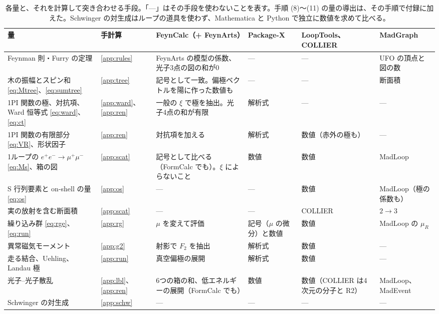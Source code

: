 \documentclass[a4paper,10pt]{ltjsarticle}
\begin{document}
\begin{table}[tbp]
\centering\small
\caption{各量と、それを計算して突き合わせる手段。「—」はその手段を使わないことを表す。手順 (8)〜(11) の量の導出は、その手順で付録に加えた。Schwinger の対生成はループの道具を使わず、Mathematica と Python で独立に数値を求めて比べる。}
\label{tab:plan}
\begin{tabularx}{\linewidth}{>{\raggedright\arraybackslash}p{3.4cm}>{\raggedright\arraybackslash}p{1.3cm}>{\raggedright\arraybackslash}X>{\raggedright\arraybackslash}p{1.75cm}>{\raggedright\arraybackslash}p{1.75cm}>{\raggedright\arraybackslash}p{2.0cm}}
\toprule
\textbf{量} & \textbf{手計算} & \textbf{FeynCalc（+ FeynArts）} & \textbf{Package-X} & \textbf{LoopTools、COLLIER} & \textbf{MadGraph} \\
\midrule
Feynman 則・Furry の定理 & \ref{app:rules} & FeynArts の模型の係数、光子3点の図の和が0 & — & — & UFO の頂点と図の数 \\
木の振幅とスピン和 \eqref{eq:Mtree}、\eqref{eq:sumtree} & \ref{app:tree} & 記号として一致。偏極ベクトルを陽に作った数値も & — & — & 断面積 \\
1PI 関数の極、対抗項、Ward 恒等式 \eqref{eq:ward}、\eqref{eq:ct} & \ref{app:ward}、\ref{app:ren} & 一般の $\xi$ で極を抽出。光子4点の和が有限 & 解析式 & — & — \\
1PI 関数の有限部分 \eqref{eq:VR}、形状因子 & \ref{app:ren} & 対抗項を加える & 解析式 & 数値（赤外の極も） & — \\
1ループの $e^+e^-\to\mu^+\mu^-$ \eqref{eq:Ms}、箱の図 & \ref{app:scat} & 記号として比べる（FormCalc でも）。$\xi$ によらないこと & 数値 & 数値 & MadLoop \\
S 行列要素と on-shell の量 \eqref{eq:os} & \ref{app:os} & — & — & 数値 & MadLoop（極の係数も） \\
実の放射を含む断面積 & \ref{app:scat} & — & — & COLLIER & $2\to3$ \\
繰り込み群 \eqref{eq:rge}、\eqref{eq:run} & \ref{app:rg} & $\mu$ を変えて評価 & 記号（$\mu$ の微分）と数値 & 数値 & MadLoop の $\mu_R$ \\
異常磁気モーメント & \ref{app:g2} & 射影で $F_2$ を抽出 & 解析式 & 数値 & — \\
走る結合、Uehling、Landau 極 & \ref{app:run} & 真空偏極の展開 & 解析式 & 数値 & — \\
光子--光子散乱 & \ref{app:lbl}、\ref{app:ren} & 6つの箱の和、低エネルギーの展開（FormCalc でも） & 数値 & 数値（COLLIER は4次元の分子と R2） & MadLoop、MadEvent \\
Schwinger の対生成 & \ref{app:schw} & — & — & — & — \\
\bottomrule
\end{tabularx}
\end{table}
\end{document}
